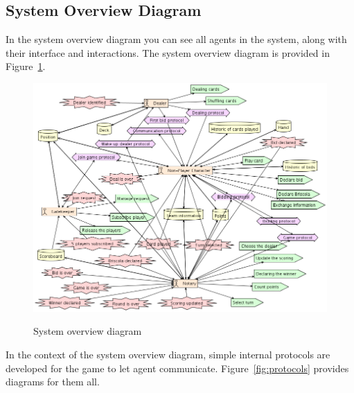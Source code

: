 \documentclass[a4paper]{article}
\begin{document}
\subsection{System Overview Diagram}

In the system overview diagram you can see all agents in the system, along with their interface and interactions. The system overview diagram is provided in Figure~\ref{fig:sysovervw}.

\begin{figure}[htp]
  \centering
  \includegraphics[keepaspectratio,scale=0.45]{pdt/images/architectural_design/system_overview.png}
  \label{fig:sysovervw}
  \caption{System overview diagram}
\end{figure}

In the context of the system overview diagram, simple internal protocols are developed for the game to let agent communicate. Figure~\ref{fig:protocols} provides diagrams for them all.
\end{document}

